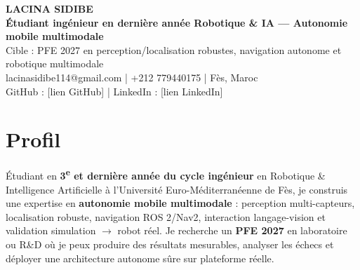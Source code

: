 \documentclass[11pt,a4paper]{article}
\begin{document}
\begin{center}
    {\Huge \textbf{LACINA SIDIBE}}\\[0.25em]
    {\large \textbf{Étudiant ingénieur en dernière année Robotique \& IA — Autonomie mobile multimodale}}\\[0.2em]
    {\small Cible : PFE 2027 en perception/localisation robustes, navigation autonome et robotique multimodale}\\[0.6em]
    lacinasidibe114@gmail.com \quad | \quad +212 779440175 \quad | \quad Fès, Maroc\\
    GitHub : [lien GitHub] \quad | \quad LinkedIn : [lien LinkedIn]
\end{center}

\vspace{0.4em}

\section{Profil}
Étudiant en \textbf{3\textsuperscript{e} et dernière année du cycle ingénieur} en Robotique \& Intelligence Artificielle à l'Université Euro-Méditerranéenne de Fès, je construis une expertise en \textbf{autonomie mobile multimodale} : perception multi-capteurs, localisation robuste, navigation ROS 2/Nav2, interaction langage-vision et validation simulation $\rightarrow$ robot réel. Je recherche un \textbf{PFE 2027} en laboratoire ou R\&D où je peux produire des résultats mesurables, analyser les échecs et déployer une architecture autonome sûre sur plateforme réelle.

\end{document}
